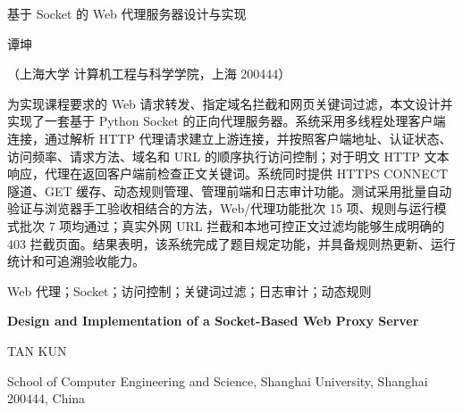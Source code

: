 \documentclass[UTF8,a4paper,10.5pt,fontset=windows]{ctexart}
\begin{document}
\setcounter{page}{1}
\begin{center}
{\heiti{} 基于 Socket 的 Web 代理服务器设计与实现\par}
\vspace{0.7em}
{\kaishu{} 谭坤\par}
\vspace{0.4em}
{\kaishu{}（上海大学 计算机工程与科学学院，上海 200444）\par}
\end{center}

\vspace{0.8em}
{\songti{}
为实现课程要求的 Web 请求转发、指定域名拦截和网页关键词过滤，本文设计并实现了一套基于 Python Socket 的正向代理服务器。系统采用多线程处理客户端连接，通过解析 HTTP 代理请求建立上游连接，并按照客户端地址、认证状态、访问频率、请求方法、域名和 URL 的顺序执行访问控制；对于明文 HTTP 文本响应，代理在返回客户端前检查正文关键词。系统同时提供 HTTPS CONNECT 隧道、GET 缓存、动态规则管理、管理前端和日志审计功能。测试采用批量自动验证与浏览器手工验收相结合的方法，Web/代理功能批次 15 项、规则与运行模式批次 7 项均通过；真实外网 URL 拦截和本地可控正文过滤均能够生成明确的 403 拦截页面。结果表明，该系统完成了题目规定功能，并具备规则热更新、运行统计和可追溯验收能力。}

\vspace{0.5em}
{\songti{} Web 代理；Socket；访问控制；关键词过滤；日志审计；动态规则}

\vspace{1.2em}
\begin{center}
{\bfseries{} Design and Implementation of a Socket-Based Web Proxy Server\par}
\vspace{0.5em}
{ TAN KUN\par}
\vspace{0.3em}
{ School of Computer Engineering and Science, Shanghai University, Shanghai 200444, China\par}
\end{center}
\end{document}
